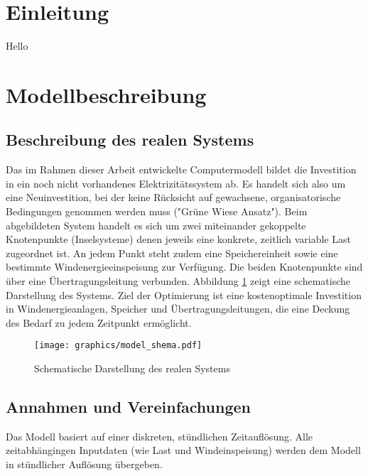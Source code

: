 
\section{Einleitung} \label{str:intro}

Hello

\section{Modellbeschreibung} \label{str:modell}


\subsection{Beschreibung des realen Systems} \label{str:reales_system}

Das im Rahmen dieser Arbeit entwickelte Computermodell bildet die Investition in ein noch nicht vorhandenes Elektrizitätssystem ab. Es handelt sich also um eine Neuinvestition, bei der keine Rücksicht auf gewachsene, organisatorische Bedingungen genommen werden muss ("Grüne Wiese Ansatz"). Beim abgebildeten System handelt es sich um zwei miteinander gekoppelte Knotenpunkte (Inselsysteme) denen jeweils eine konkrete, zeitlich variable Last zugeordnet ist. An jedem Punkt steht zudem eine Speichereinheit sowie eine bestimmte Windenergieeinspeisung zur Verfügung. Die beiden Knotenpunkte sind über eine Übertragungsleitung verbunden. Abbildung \ref{img:schema} zeigt eine schematische Darstellung des Systems. Ziel der Optimierung ist eine kostenoptimale Investition in Windenergieanlagen, Speicher und Übertragungsleitungen, die eine Deckung des Bedarf zu jedem Zeitpunkt ermöglicht.

\begin{figure}[htbp]
\centering
\texttt{[image: graphics/model\_shema.pdf]}
\caption{Schematische Darstellung des realen Systems}
\label{img:schema}
\end{figure}

\subsection{Annahmen und Vereinfachungen} \label{str:annahmen}

Das Modell basiert auf einer diskreten, stündlichen Zeitauflösung. Alle zeitabhängingen Inputdaten (wie Last und Windeinspeisung) werden dem Modell in stündlicher Auflösung übergeben. 

